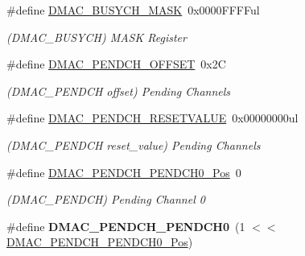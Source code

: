 \begin{DoxyCompactItemize}
\item 
\hypertarget{group___s_a_m_l21___d_m_a_c_gac6b1f692e5a02cf8171350cc32242600}{}\#define \hyperlink{group___s_a_m_l21___d_m_a_c_gac6b1f692e5a02cf8171350cc32242600}{D\+M\+A\+C\+\_\+\+B\+U\+S\+Y\+C\+H\+\_\+\+M\+A\+S\+K}~0x0000\+F\+F\+F\+Ful\label{group___s_a_m_l21___d_m_a_c_gac6b1f692e5a02cf8171350cc32242600}

\begin{DoxyCompactList}\small\item\em (D\+M\+A\+C\+\_\+\+B\+U\+S\+Y\+C\+H) M\+A\+S\+K Register \end{DoxyCompactList}\item 
\hypertarget{group___s_a_m_l21___d_m_a_c_gaf10bb5b0d5410a9184bd04850a8f51e6}{}\#define \hyperlink{group___s_a_m_l21___d_m_a_c_gaf10bb5b0d5410a9184bd04850a8f51e6}{D\+M\+A\+C\+\_\+\+P\+E\+N\+D\+C\+H\+\_\+\+O\+F\+F\+S\+E\+T}~0x2\+C\label{group___s_a_m_l21___d_m_a_c_gaf10bb5b0d5410a9184bd04850a8f51e6}

\begin{DoxyCompactList}\small\item\em (D\+M\+A\+C\+\_\+\+P\+E\+N\+D\+C\+H offset) Pending Channels \end{DoxyCompactList}\item 
\hypertarget{group___s_a_m_l21___d_m_a_c_gaae3a182523d1867015bc960f41f6be79}{}\#define \hyperlink{group___s_a_m_l21___d_m_a_c_gaae3a182523d1867015bc960f41f6be79}{D\+M\+A\+C\+\_\+\+P\+E\+N\+D\+C\+H\+\_\+\+R\+E\+S\+E\+T\+V\+A\+L\+U\+E}~0x00000000ul\label{group___s_a_m_l21___d_m_a_c_gaae3a182523d1867015bc960f41f6be79}

\begin{DoxyCompactList}\small\item\em (D\+M\+A\+C\+\_\+\+P\+E\+N\+D\+C\+H reset\+\_\+value) Pending Channels \end{DoxyCompactList}\item 
\hypertarget{group___s_a_m_l21___d_m_a_c_ga4a07a15006fe1595920ed025b62a2101}{}\#define \hyperlink{group___s_a_m_l21___d_m_a_c_ga4a07a15006fe1595920ed025b62a2101}{D\+M\+A\+C\+\_\+\+P\+E\+N\+D\+C\+H\+\_\+\+P\+E\+N\+D\+C\+H0\+\_\+\+Pos}~0\label{group___s_a_m_l21___d_m_a_c_ga4a07a15006fe1595920ed025b62a2101}

\begin{DoxyCompactList}\small\item\em (D\+M\+A\+C\+\_\+\+P\+E\+N\+D\+C\+H) Pending Channel 0 \end{DoxyCompactList}\item 
\hypertarget{group___s_a_m_l21___d_m_a_c_gaf45bffae7c8e2ec08569b35993914555}{}\#define {\bfseries D\+M\+A\+C\+\_\+\+P\+E\+N\+D\+C\+H\+\_\+\+P\+E\+N\+D\+C\+H0}~(1 $<$$<$ \hyperlink{group___s_a_m_l21___d_m_a_c_ga4a07a15006fe1595920ed025b62a2101}{D\+M\+A\+C\+\_\+\+P\+E\+N\+D\+C\+H\+\_\+\+P\+E\+N\+D\+C\+H0\+\_\+\+Pos})\label{group___s_a_m_l21___d_m_a_c_gaf45bffae7c8e2ec08569b35993914555}


\end{DoxyCompactItemize}
